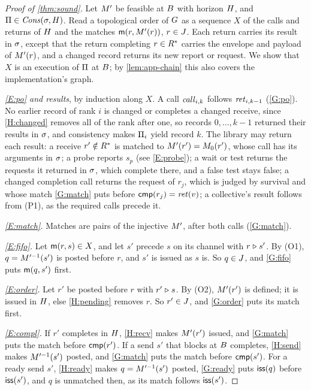 \begin{proof}[Proof of \cref{thm:sound}]
Let $M'$ be feasible at $B$ with horizon $H$, and $\Pi\in\mathit{Cons}(\sigma,H)$. Read a
topological order of $G$ as a sequence $X$ of the calls and returns of $H$ and the
matches $\mathsf{m}(r,M'(r))$, $r\in J$. Each return carries its result in $\sigma$,
except that the return completing $r\in R^{*}$ carries the envelope and payload of
$M'(r)$, and a changed record returns its new report or request. We show that $X$ is an
execution of $\Pi$ at $B$; by \cref{lem:app-chain} this also covers the implementation's
graph.

\emph{\ref{E:po} and results}, by induction along $X$. A call $\mathit{call}_{i,k}$ follows
$\mathit{ret}_{i,k-1}$ (\ref{G:po}). No earlier record of rank $i$ is changed or completes a changed
receive, since \ref{H:changed} removes all of the rank after one, so records $0,\dots,k-1$
returned their results in $\sigma$, and consistency makes $\Pi_i$ yield record $k$. The library
may return each result: a receive $r'\notin R^{*}$ is matched to $M'(r')=M_0(r')$, whose
call has its arguments in $\sigma$; a probe reports $s_p$ (see \ref{E:probe}); a wait or test
returns the requests it returned in $\sigma$, which complete there, and a false test stays false;
a changed completion call returns the request of $r_j$, which is judged by survival and whose
match \ref{G:match} puts before $\mathsf{cmp}(r_j)=\mathit{ret}(v)$; a collective's result follows from (P1),
as the required calls precede it.

\emph{\ref{E:match}.} Matches are pairs of the injective $M'$, after both calls
(\ref{G:match}).

\emph{\ref{E:fifo}.} Let $\mathsf{m}(r,s)\in X$, and let $s'$ precede $s$ on its channel with
$r\mathrel{\triangleright} s'$. By (O1), $q=M'^{-1}(s')$ is posted before $r$, and $s'$ is issued as $s$ is.
So $q\in J$, and \ref{G:fifo} puts $\mathsf{m}(q,s')$ first.

\emph{\ref{E:order}.} Let $r'$ be posted before $r$ with $r'\mathrel{\triangleright} s$. By (O2), $M'(r')$ is
defined; it is issued in $H$, else \ref{H:pending} removes $r$. So $r'\in J$, and
\ref{G:order} puts its match first.

\emph{\ref{E:compl}.} If $r'$ completes in $H$, \ref{H:recv} makes $M'(r')$ issued, and
\ref{G:match} puts the match before $\mathsf{cmp}(r')$. If a send $s'$ that blocks at $B$ completes,
\ref{H:send} makes $M'^{-1}(s')$ posted, and \ref{G:match} puts the match before $\mathsf{cmp}(s')$.
For a ready send $s'$, \ref{H:ready} makes $q=M'^{-1}(s')$ posted, \ref{G:ready} puts
$\mathsf{iss}(q)$ before $\mathsf{iss}(s')$, and $q$ is unmatched then, as its match follows $\mathsf{iss}(s')$.


\end{proof}
